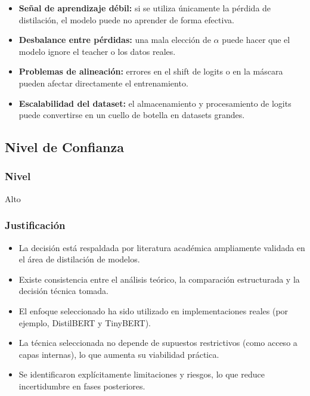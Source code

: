 \documentclass[12pt]{article}
\begin{document}
	\begin{itemize}
		\item \textbf{Señal de aprendizaje débil:} si se utiliza únicamente la pérdida de distilación, el modelo puede no aprender de forma efectiva.
		
		\item \textbf{Desbalance entre pérdidas:} una mala elección de $\alpha$ puede hacer que el modelo ignore el teacher o los datos reales.
		
		\item \textbf{Problemas de alineación:} errores en el shift de logits o en la máscara pueden afectar directamente el entrenamiento.
		
		\item \textbf{Escalabilidad del dataset:} el almacenamiento y procesamiento de logits puede convertirse en un cuello de botella en datasets grandes.
	\end{itemize}
	
	\subsection{Nivel de Confianza}
	
	\subsubsection{Nivel}
	
	Alto
	
	\subsubsection{Justificación}
	
	\begin{itemize}
		\item La decisión está respaldada por literatura académica ampliamente validada en el área de distilación de modelos.
		
		\item Existe consistencia entre el análisis teórico, la comparación estructurada y la decisión técnica tomada.
		
		\item El enfoque seleccionado ha sido utilizado en implementaciones reales (por ejemplo, DistilBERT y TinyBERT).
		
		\item La técnica seleccionada no depende de supuestos restrictivos (como acceso a capas internas), lo que aumenta su viabilidad práctica.
		
		\item Se identificaron explícitamente limitaciones y riesgos, lo que reduce incertidumbre en fases posteriores.
	\end{itemize}
	
\end{document}
